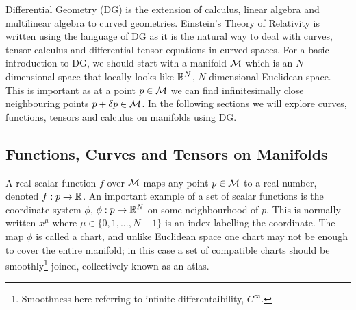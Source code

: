 Differential Geometry (DG) is the extension of calculus, linear algebra and multilinear algebra to curved
geometries. Einstein’s Theory of Relativity is written using the language of DG as it is the natural
way to deal with curves, tensor calculus and differential tensor equations in curved spaces. For a basic
introduction to DG, we should start with a manifold $\mathcal{M}$ which is an $N$ dimensional space that locally looks
like $\mathbb{R}^N$, $N$ dimensional Euclidean space. This is important as at a point $p\in\mathcal{M}$ we can find infinitesimally
close neighbouring points $p + \delta p \in \mathcal{M}$. In the following sections we will explore curves, functions, tensors and calculus on manifolds using DG.




\subsection{Functions, Curves and Tensors on Manifolds}
A real scalar function $f$ over $\mathcal{M}$ maps any point $p\in \mathcal{M}$ to a real number, denoted 
$f : p \rightarrow \mathbb{R}$. An important example of a set of scalar functions is the coordinate system $\phi$, $\phi : p \rightarrow \mathbb{R}^N$ { \color{orchid} on some neighbourhood of $p$}. This is normally written $x^\mu$ where $\mu\in\{0,1,...,N-1\}$ is an index labelling the coordinate. The map $\phi$ is called a chart,
and unlike Euclidean space one chart may not be enough to cover the entire manifold; in this case a set
of compatible charts should be smoothly\footnote{\color{orchid} Smoothness here referring to infinite differentaibility, $C^\infty$.} joined, collectively known as an atlas.

